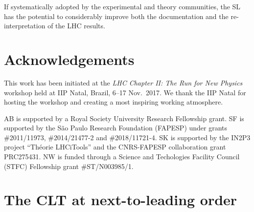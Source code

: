 \documentclass[11pt]{article}
\begin{document}


If systematically adopted by the experimental and theory communities, the SL has the potential to considerably improve both the documentation and the re-interpretation of the LHC results.





\section*{Acknowledgements}

This work has been initiated at the \textit{LHC Chapter II: The Run for New Physics} workshop held at IIP Natal, Brazil,  6--17 Nov.\ 2017. 
We thank the IIP Natal for hosting the workshop and creating a most inspiring working atmosphere.

AB is supported by a Royal Society University Research Fellowship grant. 
SF is supported by the S\~ao Paulo Research Foundation (FAPESP) under grants \#2011/11973, \#2014/21477-2 and  	
\#2018/11721-4. 
SK is supported by the IN2P3 project ``Th\'eorie LHCiTools'' and the CNRS-FAPESP collaboration grant PRC275431. 
NW is funded through a Science and Techologies Facility Council (STFC) Fellowship grant \#ST/N003985/1.


\appendix

\section{The CLT at next-to-leading order}
\label{app:skew}
\end{document}
